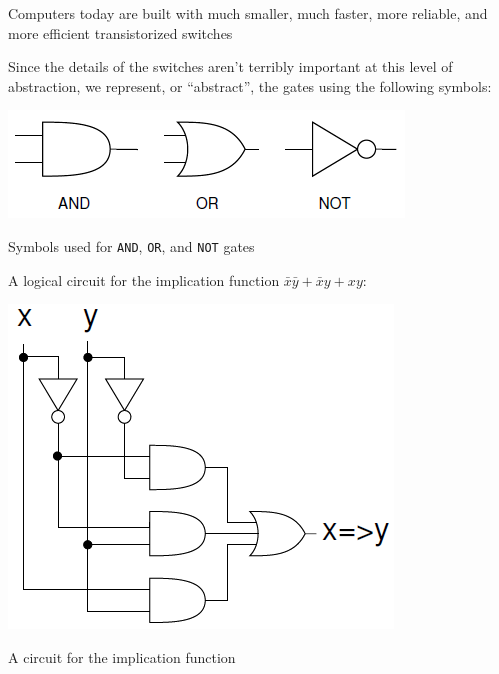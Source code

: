 \documentclass[8pt,a4paper,compress]{beamer}
\begin{document}
\begin{frame}[fragile]
Computers today are built with much smaller, much faster, more reliable, and more efficient transistorized switches 

\bigskip

Since the details of the switches aren't terribly important at this level of abstraction, we represent, or ``abstract'', the gates using the following symbols:
\begin{center}
\includegraphics[scale=0.3]{figures/gate_symbols.png}

\smallskip

\tiny Symbols used for \lstinline{AND}, \lstinline{OR}, and \lstinline{NOT} gates
\end{center}

\bigskip

A logical circuit for the implication function $\bar{x}\bar{y}+\bar{x}y+xy$:
\begin{center}
\includegraphics[scale=0.22]{figures/implication_circuit.png}

\smallskip

\tiny A circuit for the implication function
\end{center}
\end{frame}
\end{document}
